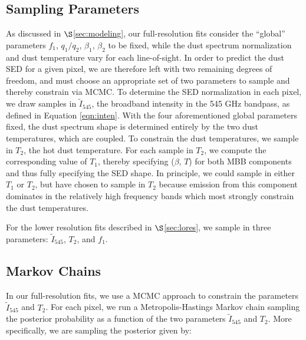 \documentclass{emulateapj}
\begin{document}
\subsection{Sampling Parameters}
\label{sec:samp}
As discussed in $\S$\ref{sec:modeling}, our full-resolution fits
consider the ``global'' parameters $f_1$, $q_1/q_2$, $\beta_1$, $\beta_2$ to be
 fixed, while the dust spectrum normalization and dust temperature vary for
each line-of-sight. In order to predict the dust SED for a given pixel, we are 
therefore left with two remaining degrees of freedom, and must choose an 
appropriate set of two parameters to sample and thereby constrain via MCMC. To 
determine the SED normalization in each pixel, we draw samples in 
$\tilde{I}_{545}$, the broadband intensity in the 545 GHz bandpass, as defined 
in Equation \ref{eqn:inten}. With the four aforementioned global parameters 
fixed, the dust spectrum shape is determined entirely by the two dust 
temperatures, which are coupled. To constrain the dust temperatures,
 we sample in $T_2$, the hot dust temperature. For each sample in $T_2$, we 
compute the corresponding value of $T_1$, thereby specifying ($\beta$, $T$) for
both MBB components and thus fully specifying the SED shape. In principle,
we could sample in either $T_1$ or $T_2$, but have chosen to sample in $T_2$ 
because emission from this component dominates in the relatively high frequency
bands which most strongly constrain the dust temperatures.

For the lower resolution fits described in $\S$\ref{sec:lores}, we sample
in three parameters: $\tilde{I}_{545}$, $T_2$, and $f_1$.


\subsection{Markov Chains}
\label{sec:mcmc}

In our full-resolution fits, we use a MCMC approach to constrain the 
parameters $\tilde{I}_{545}$ and $T_2$. For each pixel, we run a 
Metropolis-Hastings Markov chain sampling the posterior probability as a 
function of the two parameters $\tilde{I}_{545}$ and $T_2$. More specifically, 
we are sampling the posterior given by:

\end{document}
